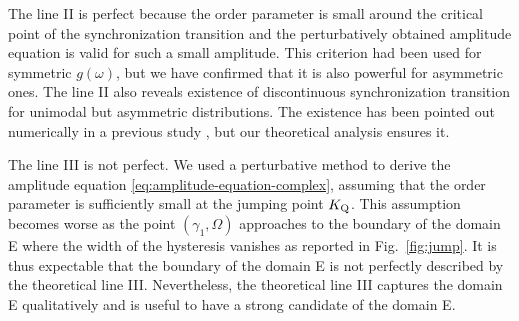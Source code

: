 The line II is perfect because the order parameter is small
around the critical point of the synchronization transition
and the perturbatively obtained amplitude equation is valid
for such a small amplitude.
This criterion had been used for symmetric $g(\omega)$,
but we have confirmed that it is also powerful for asymmetric ones.
The line II also reveals existence of discontinuous
synchronization transition for unimodal but asymmetric distributions.
The existence has been pointed out numerically in a previous study \cite{terada2018},
but our theoretical analysis ensures it.



The line III is not perfect.
We used a perturbative method to derive the amplitude equation
\eqref{eq:amplitude-equation-complex},
assuming that the order parameter is sufficiently small
at the jumping point $K_{\rm Q}$.
This assumption becomes worse as the point $(\gamma_{1},\Omega)$
approaches to the boundary of the domain E
where the width of the hysteresis vanishes
as reported in Fig.~\ref{fig:jump}.
It is thus expectable that the boundary of the domain E
is not perfectly described by the theoretical line III.
Nevertheless, the theoretical line III captures the domain E qualitatively
and is useful to have a strong candidate of the domain E.






